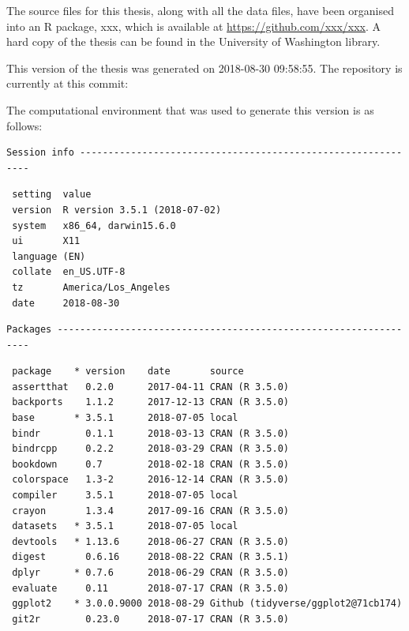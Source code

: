 \documentclass[twoside,12pt,final]{ucthesis-CA2012}
\begin{document}
\begin{ucmainmatter}
The source files for this thesis, along with all the data files, have
been organised into an R package, xxx, which is available at
\url{https://github.com/xxx/xxx}. A hard copy of the thesis can be found
in the University of Washington library.

This version of the thesis was generated on 2018-08-30 09:58:55. The
repository is currently at this commit:

The computational environment that was used to generate this version is
as follows:
\begin{verbatim}
Session info -------------------------------------------------------------
\end{verbatim}
\begin{verbatim}
 setting  value                       
 version  R version 3.5.1 (2018-07-02)
 system   x86_64, darwin15.6.0        
 ui       X11                         
 language (EN)                        
 collate  en_US.UTF-8                 
 tz       America/Los_Angeles         
 date     2018-08-30                  
\end{verbatim}
\begin{verbatim}
Packages -----------------------------------------------------------------
\end{verbatim}
\begin{verbatim}
 package    * version    date       source                               
 assertthat   0.2.0      2017-04-11 CRAN (R 3.5.0)                       
 backports    1.1.2      2017-12-13 CRAN (R 3.5.0)                       
 base       * 3.5.1      2018-07-05 local                                
 bindr        0.1.1      2018-03-13 CRAN (R 3.5.0)                       
 bindrcpp     0.2.2      2018-03-29 CRAN (R 3.5.0)                       
 bookdown     0.7        2018-02-18 CRAN (R 3.5.0)                       
 colorspace   1.3-2      2016-12-14 CRAN (R 3.5.0)                       
 compiler     3.5.1      2018-07-05 local                                
 crayon       1.3.4      2017-09-16 CRAN (R 3.5.0)                       
 datasets   * 3.5.1      2018-07-05 local                                
 devtools   * 1.13.6     2018-06-27 CRAN (R 3.5.0)                       
 digest       0.6.16     2018-08-22 CRAN (R 3.5.1)                       
 dplyr      * 0.7.6      2018-06-29 CRAN (R 3.5.0)                       
 evaluate     0.11       2018-07-17 CRAN (R 3.5.0)                       
 ggplot2    * 3.0.0.9000 2018-08-29 Github (tidyverse/ggplot2@71cb174)   
 git2r        0.23.0     2018-07-17 CRAN (R 3.5.0)                       

\end{verbatim}
\end{ucmainmatter}
\end{document}
